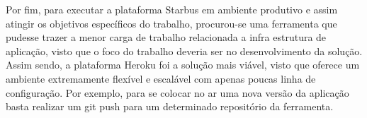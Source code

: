 Por fim, para executar a plataforma Starbus em ambiente produtivo e assim atingir os objetivos específicos do 
trabalho, procurou-se uma ferramenta que pudesse trazer a menor carga de trabalho relacionada a infra estrutura 
de aplicação, visto que o foco do trabalho deveria ser no desenvolvimento da solução. 
Assim sendo, a plataforma Heroku foi a solução mais viável, visto que oferece um ambiente extremamente flexível 
e escalável com apenas poucas linha de configuração. Por exemplo, para se colocar no ar uma nova versão da 
aplicação basta realizar um git push para um determinado repositório da ferramenta.